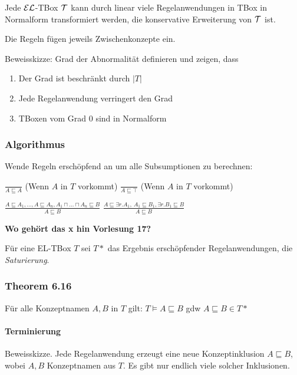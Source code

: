 \begin{lemma}
Jede $\mathcal{E}\mathcal{L}$-TBox $\mathcal{T}$ kann durch linear viele Regelanwendungen in TBox in
Normalform transformiert werden, die konservative Erweiterung von $\mathcal{T}$
ist.
\end{lemma}


Die Regeln fügen jeweils Zwischenkonzepte ein.

Beweisskizze: Grad der Abnormalität definieren und zeigen, dass

\begin{enumerate}
\def\labelenumi{\arabic{enumi}.}
\item
  Der Grad ist beschränkt durch $\left| T \right|$
\item
  Jede Regelanwendung verringert den Grad
\item
  TBoxen vom Grad $0$ sind in Normalform
\end{enumerate}

\subsubsection{Algorithmus}\label{algorithmus}

Wende Regeln erschöpfend an um alle Subsumptionen zu berechnen:

$\frac{\ }{A \sqsubseteq A}$ (Wenn $A$ in $T$ vorkommt)
$\frac{\ }{A \sqsubseteq \top}$ (Wenn $A$ in $T$ vorkommt)

$\frac{A \sqsubseteq A_1,\ldots,A \sqsubseteq A_{n},A_1 \sqcap \ldots \sqcap A_{n} \sqsubseteq B}{A \sqsubseteq B}$
$\frac{A \sqsubseteq \exists r.A_1,\ A_1 \sqsubseteq B_1,\exists r.B_1 \sqsubseteq B}{A \sqsubseteq B}$

\textbf{Wo gehört das x hin Vorlesung 17?}

Für eine EL-TBox $T$ sei $T*$ das Ergebnis erschöpfender
Regelanwendungen, die \emph{Saturierung}.

\subsubsection{Theorem 6.16 }\label{theorem-6.16}

Für alle Konzeptnamen $A,B$ in $T$ gilt:
$T \models A \sqsubseteq B$ gdw $A \sqsubseteq B \in T*$

\paragraph{Terminierung}\label{terminierung-1}

Beweisskizze. Jede Regelanwendung erzeugt eine neue Konzeptinklusion
$A \sqsubseteq B$, wobei $A,B$ Konzeptnamen aus $T$. Es gibt nur
endlich viele solcher Inklusionen.

